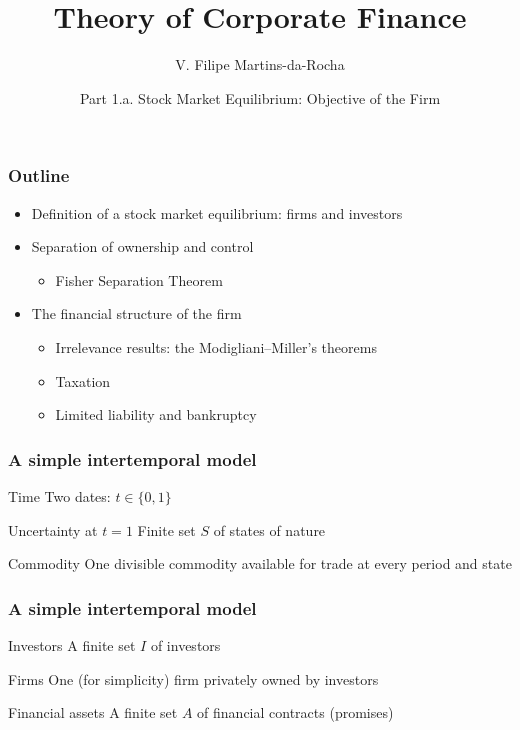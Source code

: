 \documentclass[blue]{beamer}
\title[Corporate Finance]{Theory of Corporate Finance}
\author[Victor Filipe]{V. Filipe Martins-da-Rocha}
\institute[FGV EESP]{Escola de Economia de S\~ao Paulo}
\date[April--June, 2026]{Part 1.a. Stock Market Equilibrium: Objective of the Firm}
\theoremstyle{definition}
\theoremstyle{example}
\begin{document}
\frame{\titlepage}



\begin{frame}\frametitle{Outline}
\begin{itemize}
\item Definition of a stock market equilibrium: firms and investors
\item Separation of ownership and control
    \begin{itemize}
    \item Fisher Separation Theorem
    \end{itemize}
\item The financial structure of the firm
    \begin{itemize}
    \item Irrelevance results: the Modigliani--Miller's theorems
    \item Taxation
    \item Limited liability and bankruptcy
    \end{itemize}
\end{itemize}
\end{frame}


\begin{frame}\frametitle{A simple intertemporal model}

\begin{block}{Time}
Two dates: $t\in \{0,1\}$
\end{block}

\begin{block}{Uncertainty at $t=1$}
Finite set $S$ of states of nature
\end{block}

\begin{block}{Commodity}
One divisible commodity available for trade at every period and state
\end{block}

\end{frame}


\begin{frame}\frametitle{A simple intertemporal model}

\begin{block}{Investors}
A finite set $I$ of investors
\end{block}

\begin{block}{Firms}
One (for simplicity) firm privately owned by investors
\end{block}

\begin{block}{Financial assets}
A finite set $A$ of financial contracts (promises)
\end{block}

\end{frame}
\end{document}
